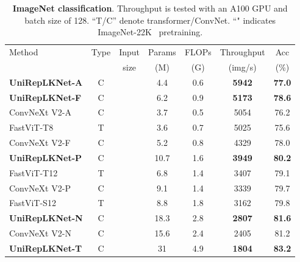 \documentclass[10pt,twocolumn,letterpaper]{article}
\begin{document}
\begin{table}[t!]
    \centering
    \renewcommand\arraystretch{0.89}
    \setlength{\tabcolsep}{0.9mm}
    \footnotesize
    \caption{\textbf{ImageNet classification}. Throughput is tested with an A100 GPU and batch size of 128. ``T/C'' denote transformer/ConvNet. ``" indicates ImageNet-22K~\cite{deng2009imagenet} pretraining.}
    \vspace{-0.1in}
    \begin{tabular}{l|c|c|c|c|c|c}
\hline
    \multirow{2}{*}{Method} & \multirow{2}{*}{Type} & Input & Params & FLOPs & Throughput & Acc \\
    & & size &(M)&(G)&(img/s)&(\%) \\ 
    \hline
    \rowcolor{gray!20}
    \textbf{UniRepLKNet-A}   &   C   &        &   4.4    &   0.6    &   \textbf{5942}    &   \textbf{77.0}    \\
    \rowcolor{gray!20}
    \textbf{UniRepLKNet-F}   &   C   &        &   6.2    &   0.9    &   \textbf{5173}    &    \textbf{78.6}       \\
    ConvNeXt V2-A~\cite{woo2023convnext}   &   C   &        &   3.7    &   0.5    &   5054    &   76.2        \\
    FastViT-T8~\cite{vasu2023fastvit}      &   T   &        &   3.6    &   0.7    &   5025    &   75.6    \\
    ConvNeXt V2-F~\cite{woo2023convnext}   &   C   &        &   5.2    &   0.8    &   4329    &   78.0        \\
    \hline
    \rowcolor{gray!20}
    \textbf{UniRepLKNet-P}   &   C   &      & 10.7 & 1.6    &   \textbf{3949}    &    \textbf{80.2}    \\
    FastViT-T12~\cite{vasu2023fastvit}      &   T   &       &   6.8     &   1.4    &   3407    &   79.1    \\
    ConvNeXt V2-P~\cite{woo2023convnext}   &   C   &        &   9.1    &   1.4   &   3339    &   79.7  \\
    FastViT-S12~\cite{vasu2023fastvit}      &   T   &       &   8.8     &   1.8    &   3162    &   79.8    \\
    \rowcolor{gray!20}
    \textbf{UniRepLKNet-N}   &   C   &    &  18.3&   2.8    &   \textbf{2807}    &    \textbf{81.6}\\
    ConvNeXt V2-N~\cite{woo2023convnext}   &   C   &        &   15.6   &   2.4   &   2405   &   81.2    \\
    \hline
    \rowcolor{gray!20}
    \textbf{UniRepLKNet-T}   &   C   &        &   31    &   4.9    &   \textbf{1804}   &   \textbf{83.2}    \\

\end{tabular}
\end{table}
\end{document}
